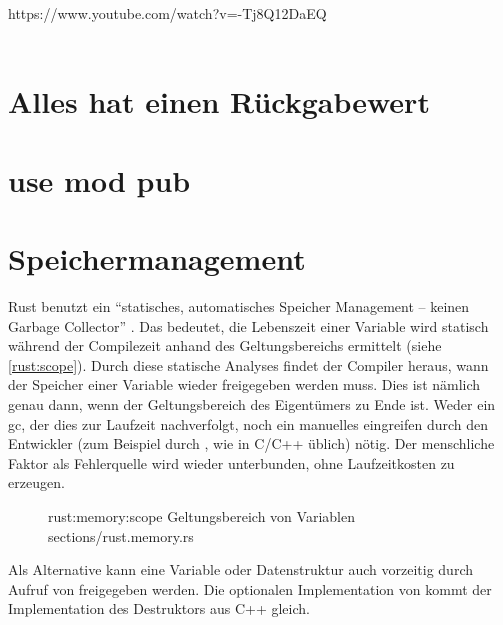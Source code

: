 https://www.youtube.com/watch?v=-Tj8Q12DaEQ \\
 \\




\section{Alles hat einen Rückgabewert}

\section{use mod pub}


\section{Speichermanagement}
\label{rust:scope}
\label{rust:static_analysis}

Rust benutzt ein \enquote{statisches, automatisches Speicher Management -- keinen Garbage Collector} \cite{rust:youtube:goto2017}.
Das bedeutet, die Lebenszeit einer Variable wird statisch während der Compilezeit anhand des Geltungsbereichs ermittelt (siehe \autoref{rust:scope}).
Durch diese statische Analyses findet der Compiler heraus, wann der Speicher einer Variable wieder freigegeben werden muss.
Dies ist nämlich genau dann, wenn der Geltungsbereich des Eigentümers zu Ende ist.
Weder ein \gls{gc}, der dies zur Laufzeit nachverfolgt, noch ein manuelles eingreifen durch den Entwickler (zum Beispiel durch , wie in C/C++ üblich) nötig.
Der menschliche Faktor als Fehlerquelle wird wieder unterbunden, ohne Laufzeitkosten zu erzeugen.


\begin{figure}[H]
	\rustcinclude
		{rust:memory:scope}
		{Geltungsbereich von Variablen}
		{sections/rust.memory.rs}
\end{figure}

Als Alternative kann eine Variable oder Datenstruktur auch vorzeitig durch Aufruf von  freigegeben werden.
Die optionalen Implementation von   kommt der Implementation des Destruktors aus C++ gleich.

 \\

